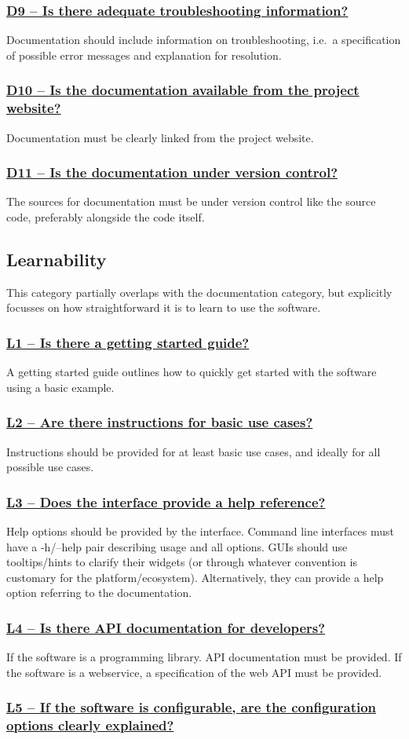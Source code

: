 \documentclass[a4paper,11pt]{article}
\newcommand{\criterion}[1]{\subsubsection*{\underline{#1}}}
\begin{document}
\criterion{D9 -- Is there adequate troubleshooting information?}

Documentation should include information on troubleshooting, i.e.\ a
specification of possible error messages and explanation for resolution.

\criterion{D10 -- Is the documentation available from the project website?}

Documentation must be clearly linked from the project website.

\criterion{D11 -- Is the documentation under version control?}

The sources for documentation must be under version control like the source
code, preferably alongside the code itself.

\subsection{Learnability}

This category partially overlaps with the documentation category, but explicitly
focusses on how straightforward it is to learn to use the software.

\criterion{L1 -- Is there a getting started guide?}

A getting started guide outlines how to quickly get started with the software
using a basic example.

\criterion{L2 -- Are there instructions for basic use cases?}

Instructions should be provided for at least basic use cases, and ideally for
all possible use cases.

\criterion{L3 -- Does the interface provide a help reference?}

Help options should be provided by the interface. Command line interfaces must
have a -h/--help pair describing usage and all options. GUIs should use tooltips/hints to clarify
their widgets (or through whatever convention is customary for the
platform/ecosystem). Alternatively, they can provide a help option referring to
the documentation.

\criterion{L4 -- Is there API documentation for developers?}

If the software is a programming library. API documentation must be provided.
If the software is a webservice, a specification of the web API must be provided.

\criterion{L5 -- If the software is configurable, are the configuration
options clearly explained?}
\end{document}
